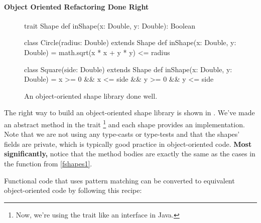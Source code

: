 \documentclass[9pt]{extbook}
\begin{document}
\paragraph{Object Oriented Refactoring Done Right}

\begin{figure}
\begin{scalacode}
trait Shape {
  def inShape(x: Double, y: Double): Boolean
}

class Circle(radius: Double) extends Shape {
   def inShape(x: Double, y: Double) = math.sqrt(x * x + y * y) <= radius
}

class Square(side: Double) extends Shape {
  def inShape(x: Double, y: Double) = x >= 0 && x <= side && y >= 0 && y <= side
}
\end{scalacode}
\caption{An object-oriented shape library done well.}
\label{jshapes1}
\end{figure}

The right way to build an object-oriented shape library is shown in .
We've made
 an abstract method in the trait
\footnote{Now, we're using the trait like an interface
in Java.} and each shape provides
an implementation. Note that we are not using any type-casts or type-tests and
that the shapes' fields are private, which is typically good practice in
object-oriented code. \textbf{Most significantly,} notice that the method
bodies are exactly the same as the cases in the function from \cref{fshapes1}.

Functional code that uses pattern matching can be converted to equivalent
object-oriented code by following this recipe:
\end{document}
